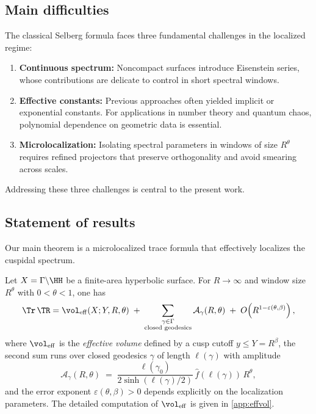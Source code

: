 \subsection{Main difficulties}\label{subsec:difficulties}

The classical Selberg formula faces three fundamental challenges in the localized regime:
\begin{enumerate}
  \item \textbf{Continuous spectrum:} Noncompact surfaces introduce Eisenstein series, 
  whose contributions are delicate to control in short spectral windows.
  \item \textbf{Effective constants:} Previous approaches often yielded implicit or exponential constants. 
  For applications in number theory and quantum chaos, polynomial dependence on geometric data is essential.
  \item \textbf{Microlocalization:} Isolating spectral parameters in windows of size $R^\theta$ 
  requires refined projectors that preserve orthogonality and avoid smearing across scales.
\end{enumerate}

Addressing these three challenges is central to the present work. 

\subsection{Statement of results}\label{subsec:results}

Our main theorem is a microlocalized trace formula that effectively localizes the cuspidal spectrum.

\begin{theorem}\label{thm:main}
Let $X=\Gamma\backslash \HH$ be a finite-area hyperbolic surface. 
For $R\to\infty$ and window size $R^\theta$ with $0<\theta<1$, one has
\[
\Tr\, \TR = \vol_{\mathrm{eff}}(X;Y,R,\theta) 
   \;+\; \sum_{\substack{\gamma \in \Gamma \\ \text{closed geodesics}}} 
   \mathcal{A}_\gamma(R,\theta) 
   \;+\; O\!\left(R^{1-\varepsilon(\theta,\beta)}\right),
\]
where $\vol_{\mathrm{eff}}$ is the \emph{effective volume} defined by a cusp cutoff $y\le Y=R^\beta$, 
the second sum runs over closed geodesics $\gamma$ of length $\ell(\gamma)$ with amplitude
\[
\mathcal{A}_\gamma(R,\theta) \;=\; 
\frac{\ell(\gamma_0)}{2\sinh(\ell(\gamma)/2)} \, 
\widehat{f}(\ell(\gamma)) \, R^\theta,
\]
and the error exponent $\varepsilon(\theta,\beta)>0$ depends explicitly on the localization parameters. 
The detailed computation of $\vol_{\mathrm{eff}}$ is given in \cref{app:effvol}.
\end{theorem}

